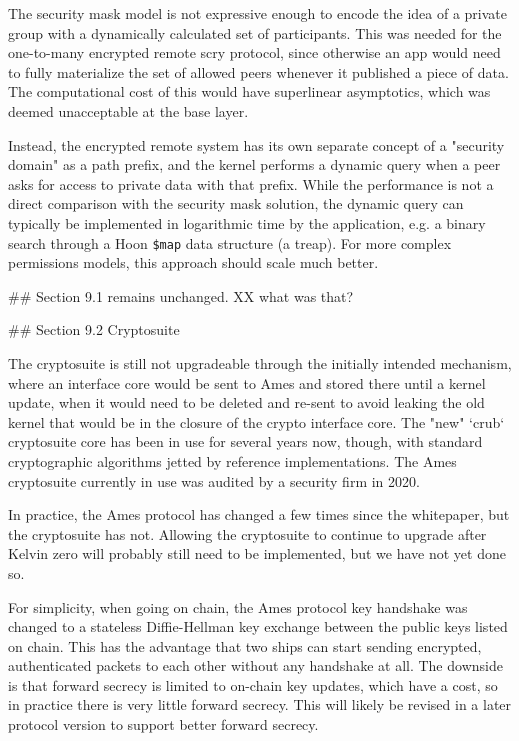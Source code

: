 \documentclass[twoside]{article}
\begin{document}
The security mask model is not expressive enough to encode the idea of a private group with a dynamically calculated set of participants.  This was needed for the one-to-many encrypted remote scry protocol, since otherwise an app would need to fully materialize the set of allowed peers whenever it published a piece of data.  The computational cost of this would have superlinear asymptotics, which was deemed unacceptable at the base layer.

Instead, the encrypted remote system has its own separate concept of a "security domain" as a path prefix, and the kernel performs a dynamic query when a peer asks for access to private data with that prefix.  While the performance is not a direct comparison with the security mask solution, the dynamic query can typically be implemented in logarithmic time by the application, e.g. a binary search through a Hoon \lstinline[style=inlinecode]{$map} data structure (a treap).  For more complex permissions models, this approach should scale much better.

## Section 9.1 remains unchanged.  XX what was that?

## Section 9.2 Cryptosuite

The cryptosuite is still not upgradeable through the initially intended mechanism, where an interface core would be sent to Ames and stored there until a kernel update, when it would need to be deleted and re-sent to avoid leaking the old kernel that would be in the closure of the crypto interface core.  The "new" `crub` cryptosuite core has been in use for several years now, though, with standard cryptographic algorithms jetted by reference implementations.  The Ames cryptosuite currently in use was audited by a security firm in 2020.

In practice, the Ames protocol has changed a few times since the whitepaper, but the cryptosuite has not.  Allowing the cryptosuite to continue to upgrade after Kelvin zero will probably still need to be implemented, but we have not yet done so.

For simplicity, when going on chain, the Ames protocol key handshake was changed to a stateless Diffie-Hellman key exchange between the public keys listed on chain.  This has the advantage that two ships can start sending encrypted, authenticated packets to each other without any handshake at all.  The downside is that forward secrecy is limited to on-chain key updates, which have a cost, so in practice there is very little forward secrecy.  This will likely be revised in a later protocol version to support better forward secrecy.
\end{document}
